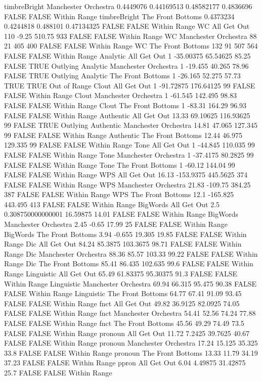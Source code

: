 timbreBright Manchester Orchestra 0.4449076 0.44169513 0.48582177 0.4836696 FALSE FALSE Within Range
timbreBright The Front Bottoms 0.4373234 0.4244818 0.488101 0.47134325 FALSE FALSE Within Range
WC All Get Out 110 -9.25 510.75 933 FALSE FALSE Within Range
WC Manchester Orchestra 88 21 405 400 FALSE FALSE Within Range
WC The Front Bottoms 132 91 507 564 FALSE FALSE Within Range
Analytic All Get Out 1 -35.00375 65.54625 85.25 FALSE TRUE Outlying
Analytic Manchester Orchestra 1 -19.455 40.265 78.96 FALSE TRUE Outlying
Analytic The Front Bottoms 1 -26.165 52.275 57.73 TRUE TRUE Out of Range
Clout All Get Out 1 -91.72875 176.64125 99 FALSE FALSE Within Range
Clout Manchester Orchestra 1 -61.545 142.495 98.83 FALSE FALSE Within Range
Clout The Front Bottoms 1 -83.31 164.29 96.93 FALSE FALSE Within Range
Authentic All Get Out 13.33 69.10625 116.93625 99 FALSE TRUE Outlying
Authentic Manchester Orchestra 14.81 47.065 127.345 99 FALSE FALSE Within Range
Authentic The Front Bottoms 12.44 46.975 129.335 99 FALSE FALSE Within Range
Tone All Get Out 1 -44.845 110.035 99 FALSE FALSE Within Range
Tone Manchester Orchestra 1 -37.4175 80.2825 99 FALSE FALSE Within Range
Tone The Front Bottoms 1 -60.12 144.04 99 FALSE FALSE Within Range
WPS All Get Out 16.13 -153.9375 445.5625 374 FALSE FALSE Within Range
WPS Manchester Orchestra 21.83 -109.75 384.25 387 FALSE FALSE Within Range
WPS The Front Bottoms 12.1 -165.825 443.495 413 FALSE FALSE Within Range
BigWords All Get Out 2.5 0.308750000000001 16.59875 14.01 FALSE FALSE Within Range
BigWords Manchester Orchestra 2.45 -0.65 17.99 25 FALSE FALSE Within Range
BigWords The Front Bottoms 3.94 -0.655 19.305 19.85 FALSE FALSE Within Range
Dic All Get Out 84.24 85.3875 103.3675 98.71 FALSE FALSE Within Range
Dic Manchester Orchestra 88.36 85.57 103.33 99.22 FALSE FALSE Within Range
Dic The Front Bottoms 85.41 86.435 102.635 99.6 FALSE FALSE Within Range
Linguistic All Get Out 65.49 61.83375 95.30375 91.3 FALSE FALSE Within Range
Linguistic Manchester Orchestra 69.94 66.315 95.475 90.38 FALSE FALSE Within Range
Linguistic The Front Bottoms 64.77 67.41 91.09 93.45 FALSE FALSE Within Range
fnct All Get Out 49.82 36.9125 82.0925 74.05 FALSE FALSE Within Range
fnct Manchester Orchestra 54.41 52.56 74.24 77.88 FALSE FALSE Within Range
fnct The Front Bottoms 45.56 49.29 74.49 73.5 FALSE FALSE Within Range
pronoun All Get Out 11.72 7.2425 39.7625 40.67 FALSE FALSE Within Range
pronoun Manchester Orchestra 17.24 15.125 35.325 33.8 FALSE FALSE Within Range
pronoun The Front Bottoms 13.33 11.79 34.19 37.23 FALSE FALSE Within Range
ppron All Get Out 6.04 4.49875 31.42875 25.7 FALSE FALSE Within Range
